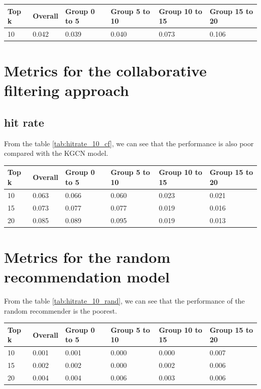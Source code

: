 \documentclass[11pt,twoside]{report}
\begin{document}
\begin{center}
    \begin{tabular}{| l | l | l | l | l | l |}
    \hline
    Top k & Overall & Group 0 to 5 & Group 5 to 10 & Group 10 to 15 & Group 15 to 20 \\ \hline
    10 & 0.042 & 0.039 & 0.040 & 0.073 & 0.106 \\ \hline
    \end{tabular}
    \label{tab:hitrate_10_tf-idf}
\end{center}

\section{Metrics for the collaborative filtering approach}
\subsection{hit rate}
From the table \ref{tab:hitrate_10_cf}, we can see that the performance is also poor compared with the KGCN model.

\begin{center}
    \begin{tabular}{| l | l | l | l | l | l |}
    \hline
    Top k & Overall & Group 0 to 5 & Group 5 to 10 & Group 10 to 15 & Group 15 to 20 \\ \hline
    10 & 0.063 & 0.066 & 0.060 & 0.023 & 0.021 \\ \hline
    15 & 0.073 & 0.077 & 0.077 & 0.019 & 0.016 \\ \hline
    20 & 0.085 & 0.089 & 0.095 & 0.019 & 0.013 \\ \hline
    \end{tabular}
    \label{tab:hitrate_10_cf}
\end{center}

\section{Metrics for the random recommendation model}
From the table \ref{tab:hitrate_10_rand}, we can see that the performance of the random recommender is the poorest.

\begin{center}
    \begin{tabular}{| l | l | l | l | l | l |}
    \hline
    Top k & Overall & Group 0 to 5 & Group 5 to 10 & Group 10 to 15 & Group 15 to 20 \\ \hline
    10 & 0.001 & 0.001 & 0.000 & 0.000 & 0.007 \\ \hline
    15 & 0.002 & 0.002 & 0.000 & 0.002 & 0.006 \\ \hline
    20 & 0.004 & 0.004 & 0.006 & 0.003 & 0.006 \\ \hline
    \end{tabular}
    \label{tab:hitrate_10_rand}
\end{center}
\end{document}
